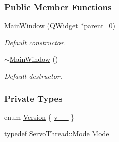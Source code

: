 \subsubsection*{Public Member Functions}
\begin{DoxyCompactItemize}
\item 
\hyperlink{a00005_a8b244be8b7b7db1b08de2a2acb9409db}{Main\+Window} (Q\+Widget $\ast$parent=0)
\begin{DoxyCompactList}\small\item\em Default constructor. \end{DoxyCompactList}\item 
\hyperlink{a00005_ae98d00a93bc118200eeef9f9bba1dba7}{$\sim$\+Main\+Window} ()
\begin{DoxyCompactList}\small\item\em Default destructor. \end{DoxyCompactList}\end{DoxyCompactItemize}
\subsubsection*{Private Types}
\begin{DoxyCompactItemize}
\item 
enum \hyperlink{a00005_a355d9f17965e5105226409313743cb9d}{Version} \{ \hyperlink{a00005_a355d9f17965e5105226409313743cb9daac0c8ddcec40274ec60fb95f59ba7aba}{v\+\_\+\_}
 \}
\item 
typedef \hyperlink{a00009_a8d581034e60792a9995d44065f6140a5}{Servo\+Thread\+::\+Mode} \hyperlink{a00005_a372482d77430e41c5483ab8605eece9d}{Mode}
\end{DoxyCompactItemize}
